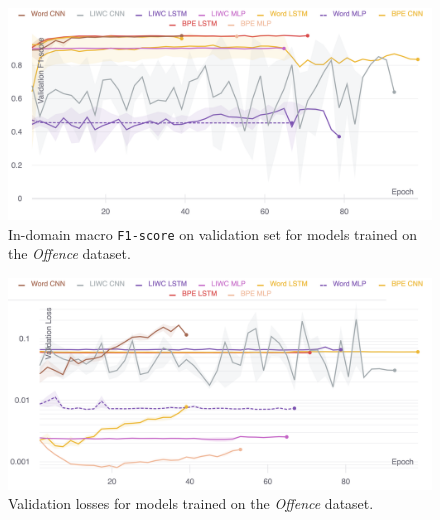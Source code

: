 \begin{figure}
    \centering
    \includegraphics[width=\textwidth]{davidson_dev_f1.pdf}
    \caption{In-domain macro \texttt{F1-score} on validation set for models trained on the \textit{Offence} dataset.}
    \label{fig:davidson_dev_f1}
\end{figure}

\begin{figure}
    \centering
    \includegraphics[width=\textwidth]{davidson_dev_loss_stderr_logscale.pdf}
    \caption{Validation losses for models trained on the \textit{Offence} dataset.}
    \label{fig:davidson_dev_loss}
\end{figure}

